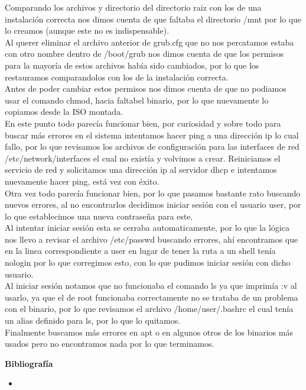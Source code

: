 \documentclass[11pt, a4paper]{report}
\begin{document}
Comparando los archivos y directorio del directorio raiz con los de una
instalación correcta nos dimos cuenta de que faltaba el directorio /mnt
por lo que lo creamos (aunque este no es indispensable). \\

Al querer eliminar el archivo anterior de grub.cfg que no nos percatamos
estaba con otro nombre dentro de /boot/grub nos dimos cuenta de que los
permisos para la mayoría de estos archivos había sido cambiados, por lo
que los restauramos comparandolos con los de la instalación correcta. \\

Antes de poder cambiar estos permisos nos dimos cuenta de que no podiamos
usar el comando chmod, hacia faltabel binario, por lo que nuevamente lo
copiamos desde la ISO montada. \\

En este punto todo parecía funcionar bien, por curiosidad y sobre todo
para buscar más errores en el sistema intentamos hacer ping a una
dirección ip lo cual fallo, por lo que revisamos los archivos de
configuración para las interfaces de red /etc/network/interfaces
el cual no existía y volvimos a crear. Reiniciamos el servicio de red
y solicitamos una dirección ip al servidor dhcp e intentamos nuevamente
hacer ping, está vez con éxito. \\

Otra vez todo parecía funcionar bien, por lo que pasamos bastante rato
buscando nuevos errores, al no encontrarlos decidimos iniciar sesión con
el usuario user, por lo que establecimos una nueva contraseña para este. \\

Al intentar iniciar sesión esta se cerraba automaticamente, por lo que
la lógica nos llevo a revisar el archivo /etc/passwd buscando errores,
ahí encontramos que en la linea correspondiente a user en lugar de tener
la ruta a un shell tenía nologin por lo que corregimos esto, con lo que
pudimos iniciar sesión con dicho usuario. \\

Al iniciar sesión notamos que no funcionaba el comando ls ya que imprimía
:v al usarlo, ya que el de root funcionaba correctamente no se trataba
de un problema con el binario, por lo que revisamos el archivo
/home/user/.bashrc el cual tenía un alias definido para ls, por lo que
lo quitamos. \\

Finalmente buscamos más errores en apt o en algunos otros de los binarios
más usados pero no encontramos nada por lo que terminamos. \\





\newpage

\textbf{Bibliografía} \\

\begin{itemize}

\item \url{}
\end{itemize}
\end{document}
